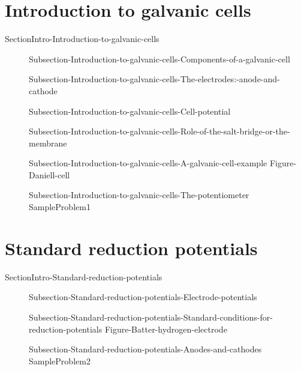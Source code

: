 \documentclass[main.tex]{subfiles}
\newcommand\chapterlabel{Ch-electrochem}\setcounter{figurenewcounter}{0}\setcounter{tablenewcounter}{0}\setcounter{formulanewcounter}{0}\chapterpicture{../{\chapterlabel}/figure1}\chapterpicturelabel{PxFuel}
\begin{document}
\section{Introduction to galvanic cells}{SectionIntro-Introduction-to-galvanic-cells}
\sloppy\begin{description}
\item[] 	{Subsection-Introduction-to-galvanic-cells-Components-of-a-galvanic-cell}
\item[]{Subsection-Introduction-to-galvanic-cells-The-electrodes:-anode-and-cathode}
\item[]{Subsection-Introduction-to-galvanic-cells-Cell-potential}
\item[]{Subsection-Introduction-to-galvanic-cells-Role-of-the-salt-bridge-or-the-membrane}
\item[]{Subsection-Introduction-to-galvanic-cells-A-galvanic-cell-example}
{Figure-Daniell-cell}
\item[] {Subsection-Introduction-to-galvanic-cells-The-potentiometer}
{SampleProblem1}
\end{description}

\section{Standard reduction potentials}{SectionIntro-Standard-reduction-potentials} 
\sloppy\begin{description}
\item[]{Subsection-Standard-reduction-potentials-Electrode-potentials}
\item[]{Subsection-Standard-reduction-potentials-Standard-conditions-for-reduction-potentials}
{Figure-Batter-hydrogen-electrode}
\item[]{Subsection-Standard-reduction-potentials-Anodes-and-cathodes}
{SampleProblem2}
\end{description}
\end{document}
